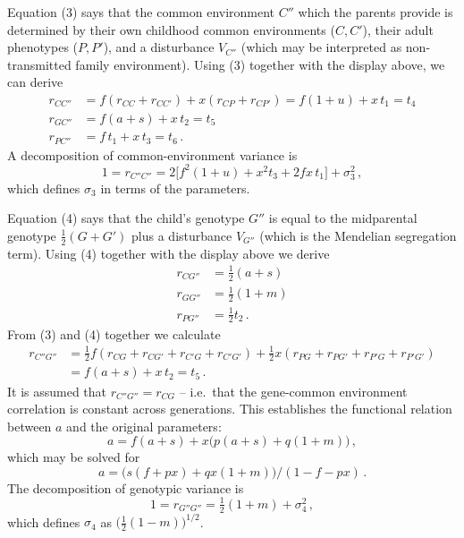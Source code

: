 ﻿\documentclass[12pt]{article}
\begin{document}
Equation (3) says that the common environment $C''$ which the parents provide is determined by their own childhood common environments ($C, C'$), their adult phenotypes ($P, P'$), and a disturbance $V_{C''}$ (which may be interpreted as non-transmitted family environment). Using (3) together with the display above, we can derive
\begin{align*}
r_{CC''} &= f(r_{CC}+r_{CC'}) + x(r_{CP}+r_{CP'}) = f(1+u) + x\,t_1 = t_4 \\
r_{GC''} &= f(a+s) + x\,t_2 = t_5 \\
r_{PC''} &= f\,t_1 + x\,t_3 = t_6 \, .
\end{align*}
A decomposition of common-environment variance is
\begin{equation*}
1 = r_{C''C''} = 2\big[f^2(1+u) + x^2 t_3 + 2fx\,t_1\big] + \sigma_3^2 \, ,
\end{equation*}
which defines $\sigma_3$ in terms of the parameters.

Equation (4) says that the child's genotype $G''$ is equal to the midparental genotype $\tfrac12(G+G')$ plus a disturbance $V_{G''}$ (which is the Mendelian segregation term). Using (4) together with the display above we derive
\begin{align*}
r_{CG''} &= \tfrac12(a+s) \\
r_{GG''} &= \tfrac12(1+m) \\
r_{PG''} &= \tfrac12 t_2 \, .
\end{align*}
From (3) and (4) together we calculate
\begin{align*}
r_{C''G''} &= \tfrac12 f(r_{CG}+r_{CG'}+r_{C'G}+r_{C'G'}) + \tfrac12 x(r_{PG}+r_{PG'}+r_{P'G}+r_{P'G'}) \\
&= f(a+s) + x\,t_2 = t_5 \, .
\end{align*}
It is assumed that $r_{C''G''} = r_{CG}$ -- i.e.\ that the gene-common environment correlation is constant across generations. This establishes the functional relation between $a$ and the original parameters:
\begin{equation*}
a = f(a+s) + x\big(p(a+s) + q(1+m)\big) \, ,
\end{equation*}
which may be solved for
\begin{equation}
a = \big(s(f+px) + qx(1+m)\big)/(1-f-px) \, . \tag{6}
\end{equation}
The decomposition of genotypic variance is
\begin{equation*}
1 = r_{G''G''} = \tfrac12(1+m) + \sigma_4^2 \, ,
\end{equation*}
which defines $\sigma_4$ as $\big(\tfrac12(1-m)\big)^{1/2}$.
\end{document}
